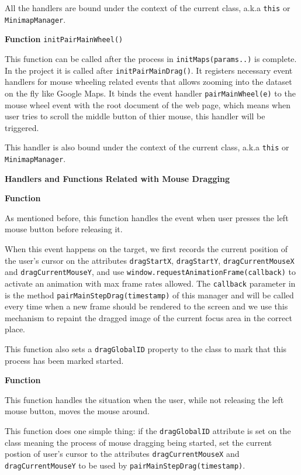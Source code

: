 All the handlers are bound under the context of the current class, a.k.a \texttt{this} or \texttt{MinimapManager}.

\textbf{Function} \verb|initPairMainWheel()|

This function can be called after the process in \texttt{initMaps(params..)} is complete. In the project it is called after \texttt{initPairMainDrag()}. It registers necessary event handlers for mouse wheeling related events that allows zooming into the dataset on the fly like Google Maps. It binds the event handler \texttt{pairMainWheel(e)} to the mouse wheel event with the root document of the web page, which means when user tries to scroll the middle button of thier mouse, this handler will be triggered.

This handler is also bound under the context of the current class, a.k.a \texttt{this} or \texttt{MinimapManager}.

\textbf{Handlers and Functions Related with Mouse Dragging}

\textbf{Function} 

As mentioned before, this function handles the event when user presses the left mouse button before releasing it.

When this event happens on the target, we first records the current position of the user's cursor on the attributes \texttt{dragStartX}, \texttt{dragStartY}, \texttt{dragCurrentMouseX} and \texttt{dragCurrentMouseY}, and use \texttt{window.requestAnimationFrame(callback)} to activate an animation with max frame rates allowed. The \texttt{callback} parameter in  is the method \texttt{pairMainStepDrag(timestamp)} of this manager and will be called every time when a new frame should be rendered to the screen and we use this mechanism to repaint the dragged image of the current focus area in the correct place.

This function also sets a \texttt{dragGlobalID} property to the class to mark that this process has been marked started.

\textbf{Function} 

This function handles the situation when the user, while not releasing the left mouse button, moves the mouse around.

This function does one simple thing: if the \texttt{dragGlobalID} attribute is set on the class meaning the process of mouse dragging being started, set the current postion of user's cursor to the attributes \texttt{dragCurrentMouseX} and \texttt{dragCurrentMouseY} to be used by \texttt{pairMainStepDrag(timestamp)}.

